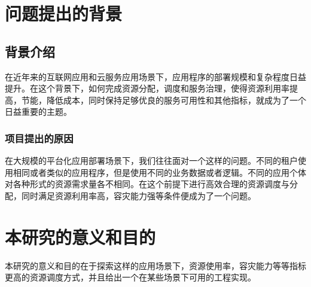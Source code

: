 \section{问题提出的背景}


\subsection{背景介绍}

在近年来的互联网应用和云服务应用场景下，应用程序的部署规模和复杂程度日益提升。在这个背景下，如何完成资源分配，调度和服务治理，使得资源利用率提高，节能，降低成本，同时保持足够优良的服务可用性和其他指标，就成为了一个日益重要的主题。

\subsubsection{项目提出的原因}

在大规模的平台化应用部署场景下，我们往往面对一个这样的问题。不同的租户使用相同或者类似的应用程序，但是使用不同的业务数据或者逻辑。不同的应用个体对各种形式的资源需求量各不相同。在这个前提下进行高效合理的资源调度与分配，同时满足资源利用率高，容灾能力强等条件便成为了一个问题。

\section{本研究的意义和目的}

本研究的意义和目的在于探索这样的应用场景下，资源使用率，容灾能力等等指标更高的资源调度方式，并且给出一个在某些场景下可用的工程实现。